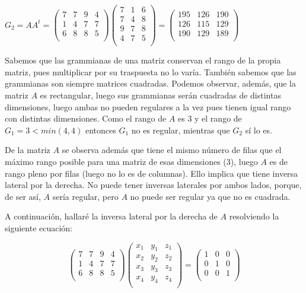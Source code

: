 \documentclass[11pt, a4paper]{article}
\newif\IfInSansMode
\theoremstyle{theorem-style}
\theoremstyle{definition-style}
\theoremstyle{remark-style}
\theoremstyle{example-style}
\begin{document}
$G_2 = AA^t = \begin{pmatrix}
7 & 7 & 9 & 4 \\
1 & 4 & 7 & 7 \\
6 & 8 & 8 & 5 \\
\end{pmatrix}\begin{pmatrix}
7 & 1 & 6 \\
7 & 4 & 8 \\
9 & 7 & 8 \\
4 & 7 & 5 \\
\end{pmatrix} = 
\begin{pmatrix}
195 & 126 & 190 \\
126 & 115 & 129 \\
190 & 129 & 189 \\
\end{pmatrix}$

Sabemos que las grammianas de una matriz conservan el rango de la propia matriz, pues multiplicar por su traspuesta no lo varía. También sabemos que las grammianas son siempre matrices cuadradas. Podemos observar, además, que la matriz $A$ es rectangular, luego sus grammianas serán cuadradas de distintas dimensiones, luego ambas no pueden regulares a la vez pues tienen igual rango con distintas dimensiones. Como el rango de $A$ es 3 y el rango de $G_1 = 3 < min(4,4)$ entonces $G_1$ no es regular, mientras que $G_2$ sí lo es.

De la matriz $A$ se observa además que tiene el mismo número de filas que el máximo rango posible para una matriz de esas dimensiones (3), luego $A$ es de rango pleno por filas (luego no lo es de columnas). Ello implica que tiene inversa lateral por la derecha. No puede tener inversas laterales por ambos lados, porque, de ser así, $A$ sería regular, pero $A$ no puede ser regular ya que no es cuadrada.

A continuación, hallaré la inversa lateral por la derecha de $A$ resolviendo la siguiente ecuación: 

$$\begin{pmatrix}
7 & 7 & 9 & 4 \\
1 & 4 & 7 & 7 \\
6 & 8 & 8 & 5 \\
\end{pmatrix}
\begin{pmatrix}
x_1 & y_1 & z_1 \\
x_2 & y_2 & z_2 \\
x_3 & y_3 & z_3 \\
x_4 & y_4 & z_4 \\
\end{pmatrix} = 
\begin{pmatrix}
1 & 0 & 0 \\
0 & 1 & 0 \\
0 & 0 & 1 \\
\end{pmatrix}$$
\end{document}
